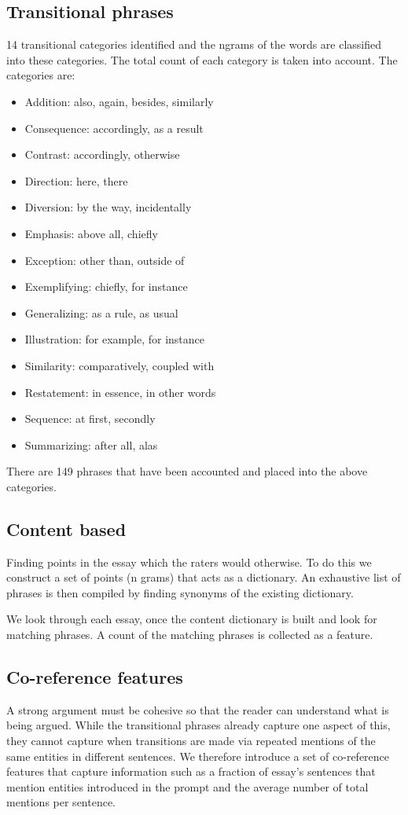 \documentclass[BTech]{nitkdiss}
\begin{document}
\subsection{Transitional phrases}
14 transitional categories identified and the ngrams of the words are classified into these categories. The total count of each category is taken into account. The categories are:
    \begin{itemize}
        \item Addition: also, again, besides, similarly
		\item Consequence: accordingly, as a result
		\item Contrast: accordingly, otherwise
		\item Direction: here, there
		\item Diversion: by the way, incidentally
		\item Emphasis: above all, chiefly
		\item Exception: other than, outside of
		\item Exemplifying: chiefly, for instance
		\item Generalizing: as a rule, as usual
		\item Illustration: for example, for instance
		\item Similarity: comparatively, coupled with
		\item Restatement: in essence, in other words
		\item Sequence: at first, secondly
		\item Summarizing: after all, alas
    \end{itemize}
There are 149 phrases that have been accounted and placed into the above categories. 
\subsection{Content based}
Finding points in the essay which the raters would otherwise. To do this we construct a set of points (n grams) that acts as a dictionary. An exhaustive list of phrases is then compiled by finding synonyms of the existing dictionary. 

We look through each essay, once the content dictionary is built and look for matching phrases. A count of the matching phrases is collected as a feature.

\subsection{Co-reference features}
A strong argument must be cohesive so that the reader can understand what is being argued. While the transitional phrases already capture one aspect of this, they cannot capture when transitions are made via repeated mentions of the same entities in different sentences. We therefore introduce a set of co-reference features that capture information such as a fraction of essay's sentences that mention entities introduced in the prompt and the average number of total mentions per sentence.
\end{document}

